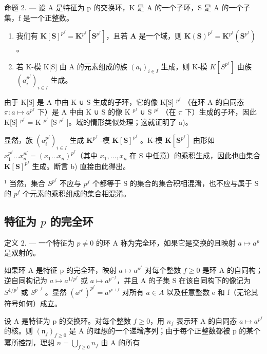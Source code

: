命题 2. --- 设 A 是特征为 p 的交换环，K 是 A 的一个子环，S 是 A 的一个子集，f 是一个正整数。

\begin{enumerate}
\def\labelenumi{\alph{enumi})}
\item
  我们有 \(\mathbf{K}[\mathbf{S}]^{p^f} = \mathbf{K}^{p^f}[\mathbf{S}^{p^f}]\)，且若 \(\mathbf{A}\) 是一个域，则 \(\mathbf{K}(\mathbf{S})^{p^f} = \mathbf{K}^{p^f}(\mathbf{S}^{p^f})\) 。
\item
  若 K-模 K{[}S{]} 由 A 的元素组成的族 \((a_{i})_{i\in I}\) 生成，则 K-模 \(K[S^{p^{f}}]\) 由族 \((a_{i}^{p^{f}})_{i\in I}\) 生成。
\end{enumerate}

由于 K{[}S{]} 是 A 中由 K ∪ S 生成的子环，它的像 K{[}S{]} \(^{p^{f}}\) （在环 A 的自同态 \(\pi: a \mapsto a^{p^{f}}\) 下）是 A 中由 K ∪ S 的像 K \(^{p^{f}}\) ∪ S \(^{p^{f}}\) （在 \(\pi\) 下）生成的子环，因此 K{[}S{]} \(^{p^{f}}\) = K \(^{p^{f}}\) {[}S \(^{p^{f}}\) {]}。域的情形类似处理；这就证明了 a)。

显然，族 \((a_i^{p^f})_{i\in I}\) 生成 \(\mathbf{K}^{p^f}\) -模 \(\mathbf{K}[\mathbf{S}]^{p^f}\) 。K-模 \(\mathbf{K}[\mathbf{S}^{p^f}]\) 由形如 \(x_1^{p^f}\ldots x_n^{p^f} = (x_1\ldots x_n)^{p^f}\)（其中 \(x_1,\ldots ,x_n\) 在 S 中任意）的乘积生成，因此也由集合 \(\mathbf{K}[\mathbf{S}]^{p^f}\) 生成。断言 b) 直接由此得出。

\(^{1}\) 当然，集合 \(S^{p^{f}}\) 不应与 \(p^{f}\) 个都等于 S 的集合的集合积相混淆，也不应与属于 S 的 \(p^{f}\) 个元素的乘积组成的集合相混淆。

\subsection{\texorpdfstring{特征为 \(p\) 的完全环}{特征为 p 的完全环}}

定义 2. --- 一个特征为 \(p \neq 0\) 的环 A 称为完全环，如果它是交换的且映射 \(a \mapsto a^p\) 是双射的。

如果环 A 是特征 p 的完全环，映射 \(a \mapsto a^{p^{f}}\) 对每个整数 \(f \geqslant 0\) 是环 A 的自同构；逆自同构记为 \(a \mapsto a^{1/p^{f}}\) 或 \(a \mapsto a^{p^{-f}}\)，并且 A 的子集 S 在该自同构下的像记为 \(S^{1/p^{f}}\) 或 \(S^{p^{-f}}\) 。显然 \((a^{p^{e}})^{p^{f}} = a^{p^{e+f}}\) 对所有 \(a \in A\) 以及任意整数 e 和 f（无论其符号如何）成立。

设 A 是特征为 p 的交换环。对每个整数 \(f \geqslant 0\)，用 \(n_{f}\) 表示环 A 的自同态 \(a \mapsto a^{p^{f}}\) 的核。则 \((\mathfrak{n}_{f})_{f \geqslant 0}\) 是 A 的理想的一个递增序列；由于每个正整数都被 p 的某个幂所控制，理想 \(n = \bigcup_{f \geqslant 0} n_{f}\) 由 A 的所有

